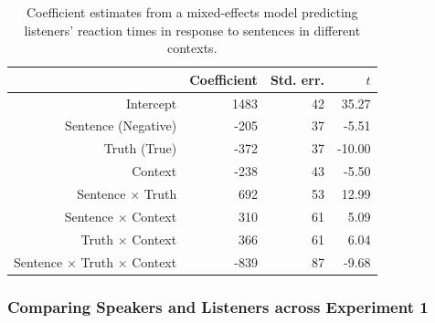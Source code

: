 \documentclass[man, floatsintext, noapacite]{apa6}
\begin{document}
\begin{table}
\caption{\label{tab: exp1_listenermodel} Coefficient estimates from a mixed-effects model predicting listeners' reaction times in response to sentences in different contexts.}
\begin{center}
\begin{tabular}{rrrr}
  \hline
 & Coefficient & Std. err. & $t$ \\ 
  \hline
Intercept & 1483 & 42 & 35.27 \\ 
  Sentence (Negative) & -205 & 37 & -5.51  \\ 
  Truth (True) & -372 & 37 & -10.00 \\
  Context & -238 & 43 & -5.50 \\ 
  Sentence $\times$ Truth & 692 & 53 & 12.99 \\
  Sentence $\times$ Context & 310 & 61 & 5.09 \\
  Truth $\times$ Context & 366 & 61 & 6.04 \\
  Sentence $\times$ Truth $\times$ Context & -839 & 87 & -9.68 \\
   \hline
\end{tabular}
\end{center}
\end{table}

\subsubsection{Comparing Speakers and Listeners across Experiment 1}
\end{document}
